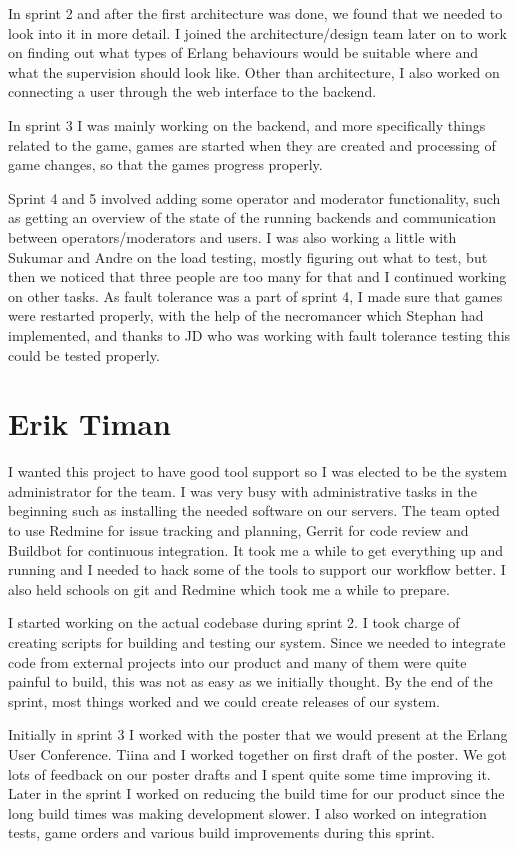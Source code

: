 \documentclass[11pt,a4paper]{report}
\begin{document}
In sprint 2 and after the first architecture was done, we found that we
needed to look into it in more detail. I joined the architecture/design team
later on to work on finding out what types of Erlang behaviours would be
suitable where and what the supervision should look like. Other than
architecture, I also worked on connecting a user through the web interface to
the backend.

In sprint 3 I was mainly working on the backend, and more specifically things
related to the game, games are started when they are created and processing of
game changes, so that the games progress properly.

Sprint 4 and 5 involved adding some operator and moderator functionality, such
as getting an overview of the state of the running backends and communication
between operators/moderators and users. I was also working a little with Sukumar
and Andre on the load testing, mostly figuring out what to test, but then we
noticed that three people are too many for that and I continued working on other
tasks.
As fault tolerance was a part of sprint 4, I made sure that games were restarted
properly, with the help of the necromancer which Stephan had implemented, and
thanks to JD who was working with fault tolerance testing this could be tested
properly.
\section{Erik Timan}
I wanted this project to have good tool support so I was elected to be the
system administrator for the team. I was very busy with administrative tasks in
the beginning such as installing the needed software on our servers. The team
opted to use Redmine for issue tracking and planning, Gerrit for code review and
Buildbot for continuous integration. It took me a while to get everything up and
running and I needed to hack some of the tools to support our workflow better. I
also held schools on git and Redmine which took me a while to prepare.

I started working on the actual codebase during sprint 2. I took charge of
creating scripts for building and testing our system. Since we needed to
integrate code from external projects into our product and many of them were
quite painful to build, this was not as easy as we initially thought. By the end
of the sprint, most things worked and we could create releases of our system.

Initially in sprint 3 I worked with the poster that we would present at the
Erlang User Conference. Tiina and I worked together on first draft of the
poster. We got lots of feedback on our poster drafts and I spent quite some time
improving it. Later in the sprint I worked on reducing the build time for our
product since the long build times was making development slower. I also worked
on integration tests, game orders and various build improvements during this
sprint.
\end{document}
